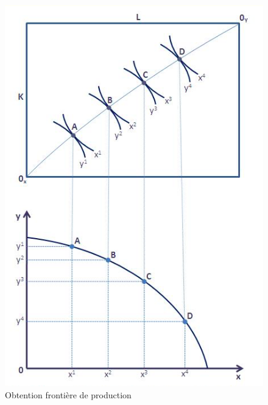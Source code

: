\begin{figure}[h]
\begin{center}
\includegraphics[scale=0.3]{./img/IM3}
\caption{Obtention frontière de production}
\end{center}
\end{figure}